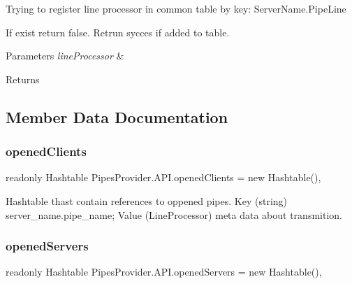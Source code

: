 Trying to register line processor in common table by key\+: Server\+Name.\+Pipe\+Line 

If exist return false. Retrun sycces if added to table. 


\begin{DoxyParams}{Parameters}
{\em line\+Processor} & \\
\hline
\end{DoxyParams}
\begin{DoxyReturn}{Returns}

\end{DoxyReturn}


\subsection{Member Data Documentation}
\mbox{\label{class_pipes_provider_1_1_a_p_i_a8efe588e9c6f7bf610310d9f6223a0f8}} 
\subsubsection{\texorpdfstring{opened\+Clients}{openedClients}}
{\footnotesize\ttfamily readonly Hashtable Pipes\+Provider.\+A\+P\+I.\+opened\+Clients = new Hashtable()\hspace{0.3cm}{\ttfamily [static]}, {\ttfamily [private]}}



Hashtable thast contain references to oppened pipes. Key (string) server\+\_\+name.\+pipe\+\_\+name; Value (Line\+Processor) meta data about transmition. 

\mbox{\label{class_pipes_provider_1_1_a_p_i_ae5d6ee8740cc704d7ac5fc619349b603}} 
\subsubsection{\texorpdfstring{opened\+Servers}{openedServers}}
{\footnotesize\ttfamily readonly Hashtable Pipes\+Provider.\+A\+P\+I.\+opened\+Servers = new Hashtable()\hspace{0.3cm}{\ttfamily [static]}, {\ttfamily [private]}}



